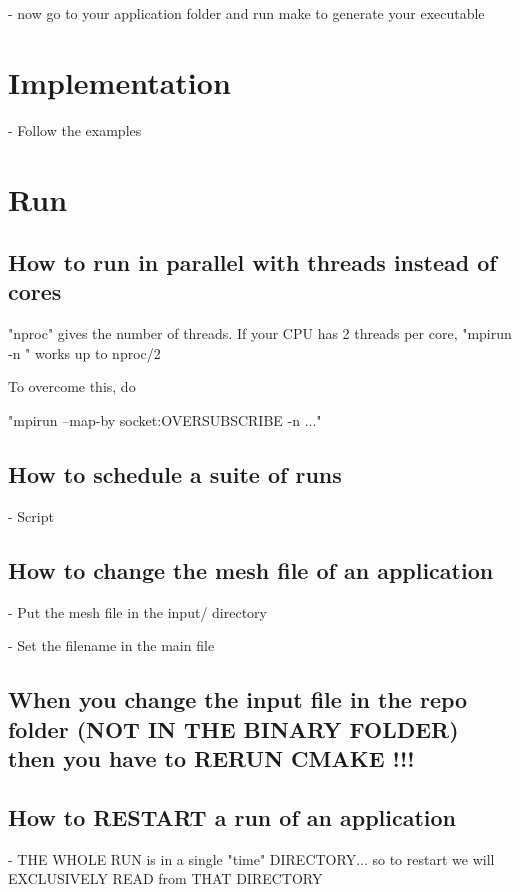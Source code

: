 \documentclass[10pt]{book}
\begin{document}
- now go to your application folder and run make to generate your executable

  \chapter{Implementation}

- Follow the examples

 \chapter{Run}

 \section{How to run in parallel with threads instead of cores}


"nproc" gives the number of threads. If your CPU has 2 threads per core, "mpirun -n " works up to nproc/2

To overcome this, do

"mpirun --map-by socket:OVERSUBSCRIBE -n ..."


 \section{How to schedule a suite of runs}

- Script

 \section{How to change the mesh file of an application}

- Put the mesh file in the input/ directory

- Set the filename in the main file

\section{When you change the input file in the repo folder (NOT IN THE BINARY FOLDER) then you have to RERUN CMAKE !!!}
 
 

 \section{How to RESTART a run of an application}
 
- THE WHOLE RUN is in a single "time" DIRECTORY...
  so to restart we will EXCLUSIVELY READ from THAT DIRECTORY
\end{document}

